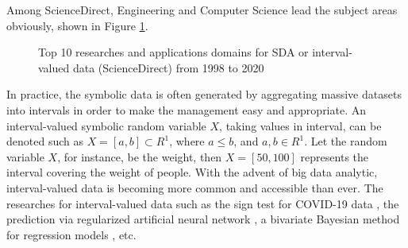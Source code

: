 \documentclass[article]{jss}
\newcommand{\imgdir}{../../../paperImage/}
\begin{document}
Among ScienceDirect, Engineering and Computer Science lead the subject areas obviously, shown in Figure \ref{fig:subjectAreas}.

\begin{figure}[htbp]	
  		\centering	 		
  		\caption{Top 10 researches and applications domains for SDA or interval-valued data (ScienceDirect) from 1998 to 2020} 
  		\label{fig:subjectAreas}   			 		 
\end{figure}

In practice, the symbolic data is often generated by aggregating massive datasets into intervals in order to make the management easy and appropriate. An interval-valued symbolic random variable $X$, taking values in interval, can be denoted such as $X = [a,b] \subset  R^{1}$, where $a \leq b$, and $a, b \in R^{1}$. Let the random variable $X$, for instance, be the weight, then $X = [50,100]$ represents the interval covering the weight of people. With the advent of big data analytic, interval-valued data is becoming more common and accessible than ever. The researches for interval-valued data such as the sign test for COVID-19 data \cite{sherwani:2021}, the prediction via regularized artificial neural network \cite{yang:2019}, a bivariate Bayesian method for regression models \cite{xu:2021}, etc.
\end{document}
